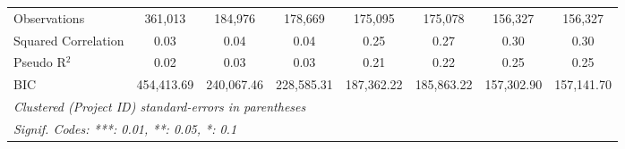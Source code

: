 \documentclass[
]{article}
\begin{document}
\begin{table}[htbp]
\begin{tabular}{lccccccc}
      Observations                        & 361,013        & 184,976        & 178,669        & 175,095       & 175,078       & 156,327       & 156,327\\  
      Squared Correlation                 & 0.03           & 0.04           & 0.04           & 0.25          & 0.27          & 0.30          & 0.30\\  
      Pseudo R$^2$                        & 0.02           & 0.03           & 0.03           & 0.21          & 0.22          & 0.25          & 0.25\\  
      BIC                                 & 454,413.69     & 240,067.46     & 228,585.31     & 187,362.22    & 185,863.22    & 157,302.90    & 157,141.70\\  
      \midrule
      \multicolumn{8}{l}{\emph{Clustered (Project ID) standard-errors in parentheses}}\\
      \multicolumn{8}{l}{\emph{Signif. Codes: ***: 0.01, **: 0.05, *: 0.1}}\\
   \end{tabular}
\end{table}
\begingroup
\centering
\small
\end{document}
